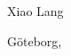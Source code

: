 \vspace{1cm}



\vfill
\hfill   Xiao Lang

\hfill  G\"{o}teborg, \TheMonth~\TheYear

\vfill



\clearpage
